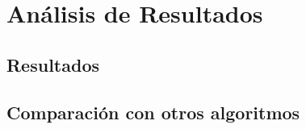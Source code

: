 \chapter{Análisis de Resultados}

    \section{Resultados}
    
        \Blindtext

    \section{Comparación con otros algoritmos}
    
        \Blindtext